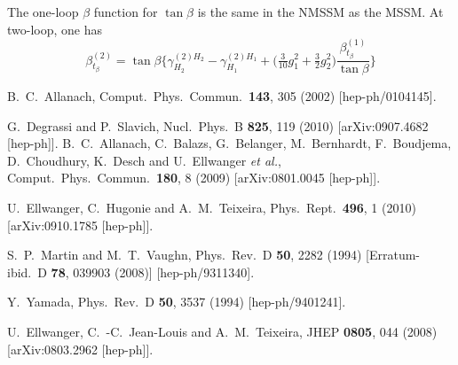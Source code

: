 \documentclass[final,3p,times,pdflatex]{elsarticle}
\newcommand{\be}{\begin{equation}}
\newcommand{\ee}{\end{equation}}
\begin{document}
The one-loop $\beta$ function for $\tan\beta$ is the same in the NMSSM as the MSSM.  At two-loop, one has
%
\be
\beta^{(2)}_{t_\beta} = \tan\beta\Bigg\{\gamma^{(2)H_2}_{H_2} - 
\gamma^{(2)H_1}_{H_1} + \Big(\tfrac{3}{10}g_1^2 + \tfrac{3}{2}g_2^2\Big)
\frac{\beta^{(1)}_{t_\beta}}{\tan\beta}\Bigg\}
\ee


\begin{thebibliography}{10}
  B.~C.~Allanach,
  Comput.\ Phys.\ Commun.\  {\bf 143}, 305 (2002)
  [hep-ph/0104145].

  G.~Degrassi and P.~Slavich,
  Nucl.\ Phys.\ B {\bf 825}, 119 (2010)
  [arXiv:0907.4682 [hep-ph]].
  B.~C.~Allanach, C.~Balazs, G.~Belanger, M.~Bernhardt, F.~Boudjema, D.~Choudhury, K.~Desch and U.~Ellwanger {\it et al.},
  Comput.\ Phys.\ Commun.\  {\bf 180}, 8 (2009)
  [arXiv:0801.0045 [hep-ph]].

  U.~Ellwanger, C.~Hugonie and A.~M.~Teixeira,
  Phys.\ Rept.\  {\bf 496}, 1 (2010)
  [arXiv:0910.1785 [hep-ph]].

  S.~P.~Martin and M.~T.~Vaughn,
  Phys.\ Rev.\ D {\bf 50}, 2282 (1994)
  [Erratum-ibid.\ D {\bf 78}, 039903 (2008)]
  [hep-ph/9311340].

  Y.~Yamada,
  Phys.\ Rev.\ D {\bf 50}, 3537 (1994)
  [hep-ph/9401241].

  U.~Ellwanger, C.~-C.~Jean-Louis and A.~M.~Teixeira,
  JHEP {\bf 0805}, 044 (2008)
  [arXiv:0803.2962 [hep-ph]].


\end{thebibliography}
\end{document}
